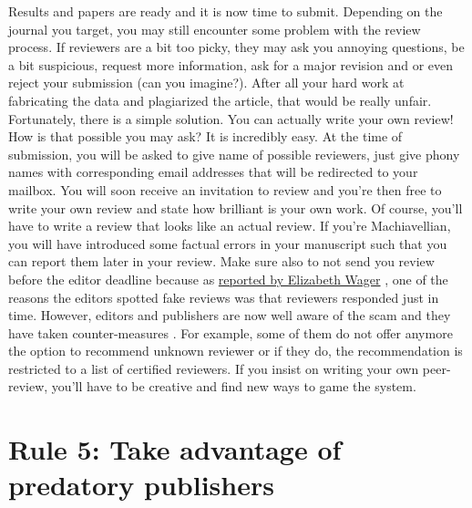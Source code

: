 \documentclass[a4paper,10pt,onecolumn]{article}
\begin{document}
Results and papers are ready and it is now time to submit. Depending on the
journal you target, you may still encounter some problem with the review
process. If reviewers are a bit too picky, they may ask you annoying questions,
be a bit suspicious, request more information, ask for a major revision and or
even reject your submission (can you imagine?). After all your hard work at
fabricating the data and plagiarized the article, that would be really
unfair. Fortunately, there is a simple solution. You can actually write your
own review! How is that possible you may ask? It is incredibly easy. At the
time of submission, you will be asked to give name of possible reviewers, just
give phony names with corresponding email addresses that will be redirected to
your mailbox. You will soon receive an invitation to review and you're then
free to write your own review and state how brilliant is your own work. Of
course, you'll have to write a review that looks like an actual review. If
you're Machiavellian, you will have introduced some factual errors in your
manuscript such that you can report them later in your review. Make sure also
to not send you review before the editor deadline because as
\href{https://arstechnica.com/science/2017/04/107-cancer-papers-retracted-due-to-peer-review-fraud/}{reported
  by Elizabeth Wager} \citep{stigbrand:2017}, one of the reasons the editors
spotted fake reviews was that reviewers responded just in time. However, editors and
publishers are now well aware of the scam \citep{ferguson:2014} and they have
taken counter-measures \citep{haug:2015}. For example, some of them do not offer
anymore the option to recommend unknown reviewer or if they do, the
recommendation is restricted to a list of certified reviewers. If you insist on
writing your own peer-review, you'll have to be creative and find new ways to
game the system.


\section*{Rule 5: Take advantage of predatory publishers}
\end{document}
